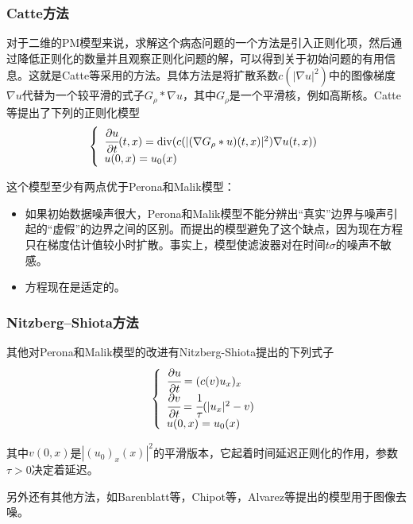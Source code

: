 \documentclass[a4paper,12pt]{article}
\begin{document}
\subsubsection{Catte方法}
对于二维的PM模型来说，求解这个病态问题的一个方法是引入正则化项，然后通过降低正则化的数量并且观察正则化问题的解，可以得到关于初始问题的有用信息。这就是Catte等\cite{catte1992image}采用的方法。具体方法是将扩散系数$c(|\nabla u|^2)$中的图像梯度$\nabla u$代替为一个较平滑的式子$G_{\rho}\ast \nabla u$，其中$G_{\rho}$是一个平滑核，例如高斯核。Catte等提出了下列的正则化模型
\begin{displaymath}
\left\{
\begin{array}{ll}
\cfrac{\partial u}{\partial t}(t,x)=\mathrm{div}(c(|(\nabla G_{\rho}\ast u)(t,x)|^2)\nabla u(t,x))\\
u(0,x)=u_0(x)
\end{array}\right.
\end{displaymath}

这个模型至少有两点优于Perona和Malik模型：
\begin{itemize}
\item 如果初始数据噪声很大，Perona和Malik模型不能分辨出``真实''边界与噪声引起的``虚假''的边界之间的区别。而提出的模型避免了这个缺点，因为现在方程只在梯度估计值较小时扩散。事实上，模型使滤波器对在时间$t\sigma$的噪声不敏感。
\item 方程现在是适定的。
\end{itemize}

\subsubsection{Nitzberg–Shiota方法}
其他对Perona和Malik模型的改进有Nitzberg-Shiota\cite{nitzberg1992nonlinear}提出的下列式子
\begin{displaymath}
\left\{
\begin{array}{lll}
\cfrac{\partial u}{\partial t}=(c(v)u_x)_x\\
\cfrac{\partial v}{\partial t}=\cfrac{1}{\tau}(|u_x|^2-v)\\
u(0,x)=u_0(x) 
\end{array}\right.
\end{displaymath}

其中$v(0,x)$是$|(u_0)_x(x)|^2$的平滑版本，它起着时间延迟正则化的作用，参数$\tau>0$决定着延迟。

另外还有其他方法，如Barenblatt等\cite{barenblatt1993degenerate}，Chipot等\cite{chipot1997analysis}，Alvarez等\cite{alvarez1992image}提出的模型用于图像去噪。
\end{document}
